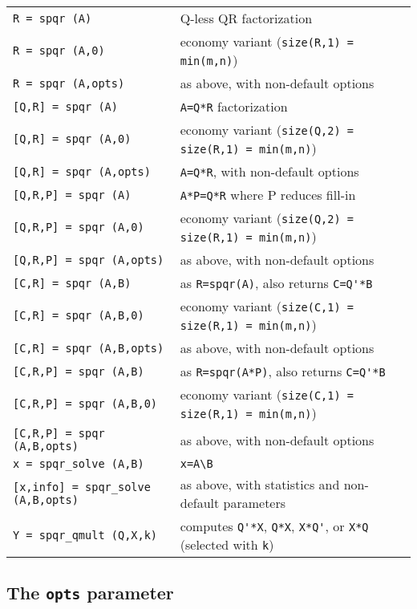 \documentclass[12pt]{article}
\begin{document}
\vspace{0.1in}

{\footnotesize
\begin{tabular}{|ll|}
\hline
\verb'R = spqr (A)'             & Q-less QR factorization \\
\verb'R = spqr (A,0)'           & economy variant (\verb'size(R,1) = min(m,n)') \\
\verb'R = spqr (A,opts)'        & as above, with non-default options \\
\hline
\verb'[Q,R] = spqr (A)'         & \verb'A=Q*R' factorization \\
\verb'[Q,R] = spqr (A,0)'       & economy variant (\verb'size(Q,2) = size(R,1) = min(m,n)') \\
\verb'[Q,R] = spqr (A,opts)'    & \verb'A=Q*R', with non-default options \\
\hline
\verb'[Q,R,P] = spqr (A)'       & \verb'A*P=Q*R' where P reduces fill-in \\
\verb'[Q,R,P] = spqr (A,0)'     & economy variant (\verb'size(Q,2) = size(R,1) = min(m,n)') \\
\verb'[Q,R,P] = spqr (A,opts)'  & as above, with non-default options \\
\hline
\verb'[C,R] = spqr (A,B)'       & as \verb'R=spqr(A)', also returns \verb"C=Q'*B" \\
\verb'[C,R] = spqr (A,B,0)'     & economy variant (\verb'size(C,1) = size(R,1) = min(m,n)') \\
\verb'[C,R] = spqr (A,B,opts)'  & as above, with non-default options \\
\hline
\verb'[C,R,P] = spqr (A,B)'     & as \verb'R=spqr(A*P)', also returns \verb"C=Q'*B" \\
\verb'[C,R,P] = spqr (A,B,0)'   & economy variant (\verb'size(C,1) = size(R,1) = min(m,n)') \\
\verb'[C,R,P] = spqr (A,B,opts)'& as above, with non-default options \\
\hline
\verb'x = spqr_solve (A,B)'     & \verb'x=A\B' \\
\verb'[x,info] = spqr_solve (A,B,opts)' & as above, with statistics and non-default parameters \\
\hline
\verb'Y = spqr_qmult (Q,X,k)'   & computes \verb"Q'*X", \verb"Q*X", \verb"X*Q'", or \verb"X*Q"
(selected with \verb'k') \\
\hline
\end{tabular}
}

\subsection{The {\tt opts} parameter}
\end{document}
